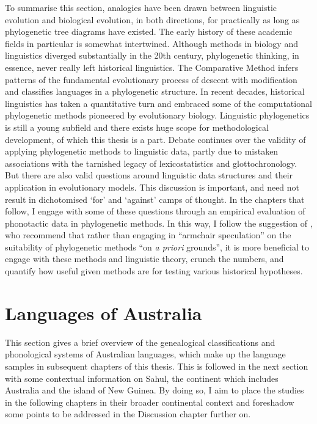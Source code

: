 To summarise this section, analogies have been drawn between linguistic evolution and biological evolution, in both directions, for practically as long as phylogenetic tree diagrams have existed. The early history of these academic fields in particular is somewhat intertwined. Although methods in biology and linguistics diverged substantially in the 20th century, phylogenetic thinking, in essence, never really left historical linguistics. The Comparative Method infers patterns of the fundamental evolutionary process of descent with modification and classifies languages in a phylogenetic structure. In recent decades, historical linguistics has taken a quantitative turn and embraced some of the computational phylogenetic methods pioneered by evolutionary biology. Linguistic phylogenetics is still a young subfield and there exists huge scope for methodological development, of which this thesis is a part. Debate continues over the validity of applying phylogenetic methods to linguistic data, partly due to mistaken associations with the tarnished legacy of lexicostatistics and glottochronology. But there are also valid questions around linguistic data structures and their application in evolutionary models. This discussion is important, and need not result in dichotomised `for' and `against' camps of thought. In the chapters that follow, I engage with some of these questions through an empirical evaluation of phonotactic data in phylogenetic methods. In this way, I follow the suggestion of \textcite[p.~2299]{greenhill_does_2009}, who recommend that rather than engaging in ``armchair speculation'' on the suitability of phylogenetic methods ``on \emph{a priori} grounds'', it is more beneficial to engage with these methods and linguistic theory, crunch the numbers, and quantify how useful given methods are for testing various historical hypotheses.

\hypertarget{languages-of-australia}{%
\section{Languages of Australia}\label{languages-of-australia}}

This section gives a brief overview of the genealogical classifications and phonological systems of Australian languages, which make up the language samples in subsequent chapters of this thesis. This is followed in the next section with some contextual information on Sahul, the continent which includes Australia and the island of New Guinea. By doing so, I aim to place the studies in the following chapters in their broader continental context and foreshadow some points to be addressed in the Discussion chapter further on.

